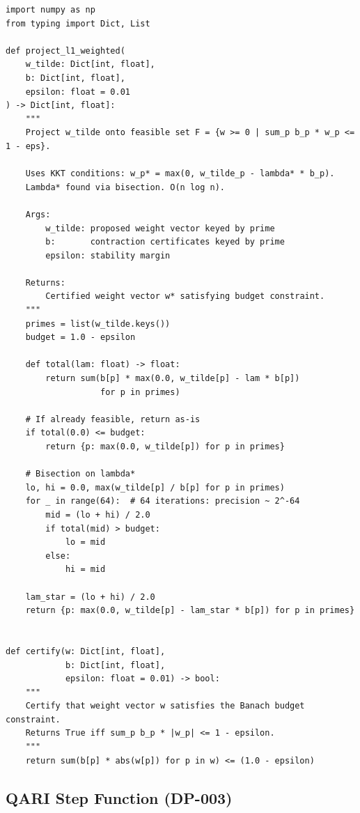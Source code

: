\documentclass[12pt,letterpaper]{article}
\begin{document}
\begin{lstlisting}[caption={ACE: KKT soft-threshold projection onto
                   prime-indexed budget simplex},
                   label={lst:ace}]
import numpy as np
from typing import Dict, List

def project_l1_weighted(
    w_tilde: Dict[int, float],
    b: Dict[int, float],
    epsilon: float = 0.01
) -> Dict[int, float]:
    """
    Project w_tilde onto feasible set F = {w >= 0 | sum_p b_p * w_p <= 1 - eps}.

    Uses KKT conditions: w_p* = max(0, w_tilde_p - lambda* * b_p).
    Lambda* found via bisection. O(n log n).

    Args:
        w_tilde: proposed weight vector keyed by prime
        b:       contraction certificates keyed by prime
        epsilon: stability margin

    Returns:
        Certified weight vector w* satisfying budget constraint.
    """
    primes = list(w_tilde.keys())
    budget = 1.0 - epsilon

    def total(lam: float) -> float:
        return sum(b[p] * max(0.0, w_tilde[p] - lam * b[p])
                   for p in primes)

    # If already feasible, return as-is
    if total(0.0) <= budget:
        return {p: max(0.0, w_tilde[p]) for p in primes}

    # Bisection on lambda*
    lo, hi = 0.0, max(w_tilde[p] / b[p] for p in primes)
    for _ in range(64):  # 64 iterations: precision ~ 2^-64
        mid = (lo + hi) / 2.0
        if total(mid) > budget:
            lo = mid
        else:
            hi = mid

    lam_star = (lo + hi) / 2.0
    return {p: max(0.0, w_tilde[p] - lam_star * b[p]) for p in primes}


def certify(w: Dict[int, float],
            b: Dict[int, float],
            epsilon: float = 0.01) -> bool:
    """
    Certify that weight vector w satisfies the Banach budget constraint.
    Returns True iff sum_p b_p * |w_p| <= 1 - epsilon.
    """
    return sum(b[p] * abs(w[p]) for p in w) <= (1.0 - epsilon)
\end{lstlisting}

\subsection{QARI Step Function (DP-003)}
\end{document}
